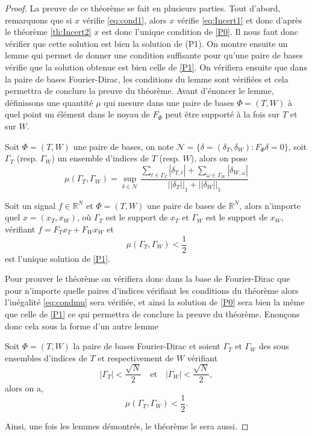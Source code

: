 \begin{proof}
	La preuve de ce théorème se fait en plusieurs parties.
	Tout d'abord, remarquons que si $x$ vérifie \ref{eq:cond1}, alors $x$ vérifie \ref{eq:Incert1} et donc d'après le théorème \ref{th:Incert2} $x$ est donc l'unique condition de \ref{P0}.
	Il nous faut donc vérifier que cette solution est bien la solution de (P1).
	On montre ensuite un lemme qui permet de donner une condition suffisante pour qu'une paire de bases vérifie que la solution obtenue est bien celle de \ref{P1}.
	On vérifiera ensuite que dans la paire de bases Fourier-Dirac, les conditions du lemme sont vérifiées et cela permettra de conclure la preuve du théorème.
	Avant d'énoncer le lemme, définissons une quantité $\mu$ qui mesure dans une paire de bases $\Phi=(T,W)$ à quel point un élément dans le noyau de $F_\Phi$ peut être supporté à la fois sur $T$ et sur $W$.
	\begin{definition}
		Soit $\Phi = (T,W)$ une paire de bases, on note $\mathcal{N} = \{\delta = (\delta_T, \delta_W): F_\Phi \delta = 0\}$, soit $\Gamma_T$ (resp. $\Gamma_W$) un ensemble d'indices de $T$ (resp. $W$), alors on pose
		\begin{equation}
			\mu(\Gamma_T, \Gamma_W) = \sup_{\delta \in \mathcal{N}} \frac{\sum_{t \in \Gamma_T} |\delta_{T,t}| + \sum_{\omega \in \Gamma_W} |\delta_{W,\omega}|  }{||\delta_T||_1 + ||\delta_W||_1 }
		\end{equation}
	\end{definition}
	\begin{lemme}\label{th:muP1}
		Soit un signal $f \in \mathbb{R}^N$ et $\Phi=(T,W)$ une paire de bases de $\mathbb{R}^N$, alors n'importe quel $x = (x_T, x_W)$, où $\Gamma_T$ est le support de $x_T$ et $\Gamma_W$ est le support de $x_W$, 	vérifiant $f = F_T x_T + F_W x_W$ et
		\begin{equation}\label{eq:condmu}
			\mu(\Gamma_T, \Gamma_W) < \frac{1}{2}
		\end{equation}
		est l'unique solution de \ref{P1}.
	\end{lemme}
	Pour prouver le théorème on vérifiera donc dans la base de Fourier-Dirac que pour n'importe quelle paires d'indices vérifiant les conditions du théorème alors l'inégalité \ref{eq:condmu} sera vérifiée, et ainsi la solution de \ref{P0} sera bien la même que celle de \ref{P1} ce qui permettra de conclure la preuve du théorème.
	Enonçons donc cela sous la forme d'un autre lemme
	\begin{lemme}\label{th:muFD}
		Soit $\Phi=(T,W)$ la paire de bases Fourier-Dirac et soient $\Gamma_T$  et $\Gamma_W$ des sous ensembles d'indices de $T$ et respectivement de $W$ vérifiant
		\begin{equation}
			|\Gamma_T| < \frac{\sqrt{N}}{2} \quad \text{et} \quad |\Gamma_W| < \frac{\sqrt{N}}{2},
		\end{equation}
		alors on a,
		\begin{equation}
			\mu(\Gamma_T, \Gamma_W) < \frac{1}{2}.
		\end{equation}
	\end{lemme}
	Ainsi, une fois les lemmes démontrés, le théorème le sera aussi.
	\end{proof}
